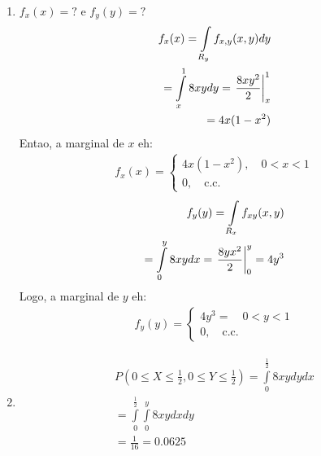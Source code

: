 \begin{description}
\begin{example}
   \begin{enumerate}[label=(\alph*)]
     \item $f_{x} (x)= ?$ e $f_{y}(y)=?$
      \begin{align*}
        f_{x} (x)= \int \limits_{R_{y}} f_{x,y} (x,y) dy \\
        = \int \limits_{x}^{1} 8xy dy = \left. \frac{8xy^2}{2} \right\rvert_{x}^{1} \\
      = 4x(1-x^2)
      \end{align*}
      Entao, a marginal de $x$ eh:
      \begin{align*}
        f_{x} (x)= \begin{cases}
          4x(1-x^2) , \quad 0<x<1 \\
          0, \quad \text{c.c.}
        \end{cases}
      \end{align*}
        \begin{align*}
          f_{y}(y)= \int \limits_{R_{x}} f_{xy} (x,y) \\
          = \int \limits_{0}^{y} 8xy dx = \left.\frac{8yx^2}{2}\right\rvert_{0}^{y} = 4y^3
        \end{align*}
        Logo, a marginal de $y$ eh:
        \begin{align*}
          f_{y }(y)= \begin{cases}
           4y^3= \quad 0<y<1 \\
           0, \quad \text{c.c.}
          \end{cases}
        \end{align*}
      \item 
        \begin{align*}
          P(0 \leq X \leq \frac{1}{2}, 0 \leq Y \leq \frac{1}{2}) = \int \limits_{0}^{\frac{1}{2}} 8xy dy dx\\
          = \int \limits_{0}^{\frac{1}{2}} \int \limits_{0}^{y} 8xy dx dy \\
          = \frac{1}{16}=0.0625
        \end{align*}
   \end{enumerate} 
     \end{example}

\end{description}

